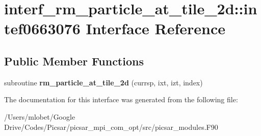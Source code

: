 \hypertarget{interfaceinterf__rm__particle__at__tile__2d_1_1intef0663076}{}\section{interf\+\_\+rm\+\_\+particle\+\_\+at\+\_\+tile\+\_\+2d\+:\+:intef0663076 Interface Reference}
\label{interfaceinterf__rm__particle__at__tile__2d_1_1intef0663076}
\subsection*{Public Member Functions}
\begin{DoxyCompactItemize}
\item 
subroutine {\bfseries rm\+\_\+particle\+\_\+at\+\_\+tile\+\_\+2d} (currsp, ixt, izt, index)\hypertarget{interfaceinterf__rm__particle__at__tile__2d_1_1intef0663076_a728561ce886378c0c193206068920e67}{}\label{interfaceinterf__rm__particle__at__tile__2d_1_1intef0663076_a728561ce886378c0c193206068920e67}

\end{DoxyCompactItemize}


The documentation for this interface was generated from the following file\+:\begin{DoxyCompactItemize}
\item 
/\+Users/mlobet/\+Google Drive/\+Codes/\+Picsar/picsar\+\_\+mpi\+\_\+com\+\_\+opt/src/picsar\+\_\+modules.\+F90\end{DoxyCompactItemize}
